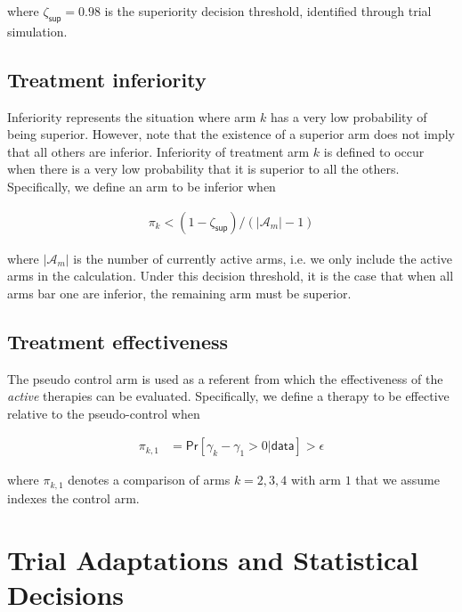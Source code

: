 \documentclass[
]{article}
\begin{document}
where $\zeta_{\mathsf{sup}} = 0.98$ is the superiority decision threshold, identified through trial simulation.

\hypertarget{treatment-inferiority}{%
  \subsection{Treatment inferiority}\label{treatment-inferiority}}

Inferiority represents the situation where arm $k$ has a very low probability of being superior.
However, note that the existence of a superior arm does not imply that all others are inferior.
Inferiority of treatment arm $k$ is defined to occur when there is a very low probability that it is superior to all the others.
Specifically, we define an arm to be inferior when

\[
  \begin{aligned}
    \pi_{k} < (1 - \zeta_{\mathsf{sup}}) / (|\mathcal{A}_m| - 1)
  \end{aligned}
\]

where $|\mathcal{A}_m|$ is the number of currently active arms, i.e. we only include the active arms in the calculation.
Under this decision threshold, it is the case that when all arms bar one are inferior, the remaining arm must be superior.

\hypertarget{treatment-effectiveness}{%
  \subsection{Treatment effectiveness}\label{treatment-effectiveness}}

The pseudo control arm is used as a referent from which the effectiveness of the \textit{active} therapies can be evaluated.
Specifically, we define a therapy to be effective relative to the pseudo-control when

\[
  \begin{aligned}
    \pi_{k,1} & = \mathsf{Pr}[\gamma_{k} - \gamma_{1} >0|\mathsf{data}] > \epsilon
  \end{aligned}
\]

where $\pi_{k,1}$ denotes a comparison of arms $k = 2, 3, 4$ with arm $1$ that we assume indexes the control arm.

\clearpage

\hypertarget{trial-adaptations-and-statistical-decisions}{%
  \section{Trial Adaptations and Statistical Decisions}\label{trial-adaptations-and-statistical-decisions}}
\end{document}
